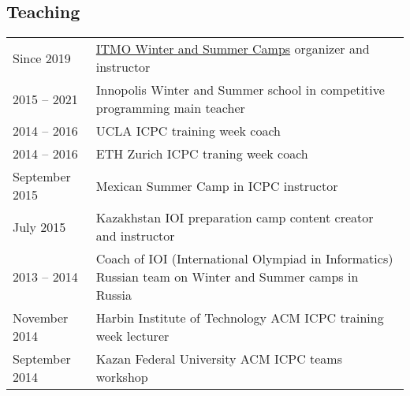 \documentclass[11pt,a4paper,oneside]{article}
\begin{document}
\subsection{Teaching}

\begin{tabular}{l|p{15 cm}}
Since 2019 & \href{https://schools.itmo.ru/en/school/32/}{ITMO Winter and Summer Camps} organizer and instructor \\
2015 -- 2021 & Innopolis Winter and Summer school in competitive programming main teacher \\
2014 -- 2016 & UCLA ICPC training week coach \\
2014 -- 2016 & ETH Zurich ICPC traning week coach \\
September 2015 & Mexican Summer Camp in ICPC instructor \\
July 2015 & Kazakhstan IOI preparation camp content creator and instructor \\
2013 -- 2014 & Coach of IOI (International Olympiad in Informatics) Russian team on Winter and Summer camps in Russia \\
November 2014 & Harbin Institute of Technology ACM ICPC training week lecturer \\
September 2014 & Kazan Federal University ACM ICPC teams workshop \\
\end{tabular}
\end{document}
